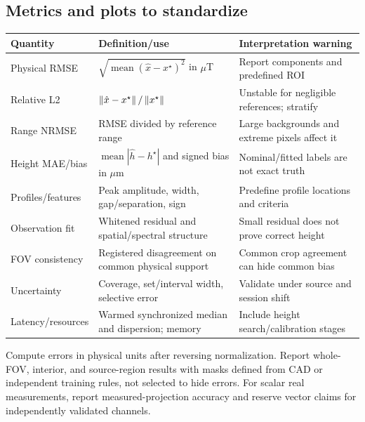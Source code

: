 \subsection{Metrics and plots to standardize}
\begin{longtable}{P{32mm}P{68mm}P{51mm}}
\toprule Quantity & Definition/use & Interpretation warning\\\midrule\endhead
Physical RMSE & $\sqrt{\operatorname{mean}(\hat x-x^\star)^2}$ in $\mu$T & Report components and predefined ROI\\
Relative L2 & $\left\lVert\hat x-x^\star\right\rVert/\left\lVert x^\star\right\rVert$ & Unstable for negligible references; stratify\\
Range NRMSE & RMSE divided by reference range & Large backgrounds and extreme pixels affect it\\
Height MAE/bias & $\operatorname{mean}|\hat h-h^\star|$ and signed bias in $\mu$m & Nominal/fitted labels are not exact truth\\
Profiles/features & Peak amplitude, width, gap/separation, sign & Predefine profile locations and criteria\\
Observation fit & Whitened residual and spatial/spectral structure & Small residual does not prove correct height\\
FOV consistency & Registered disagreement on common physical support & Common crop agreement can hide common bias\\
Uncertainty & Coverage, set/interval width, selective error & Validate under source and session shift\\
Latency/resources & Warmed synchronized median and dispersion; memory & Include height search/calibration stages\\\bottomrule
\end{longtable}

Compute errors in physical units after reversing normalization. Report whole-FOV, interior, and source-region results with masks defined from CAD or independent training rules, not selected to hide errors. For scalar real measurements, report measured-projection accuracy and reserve vector claims for independently validated channels.

